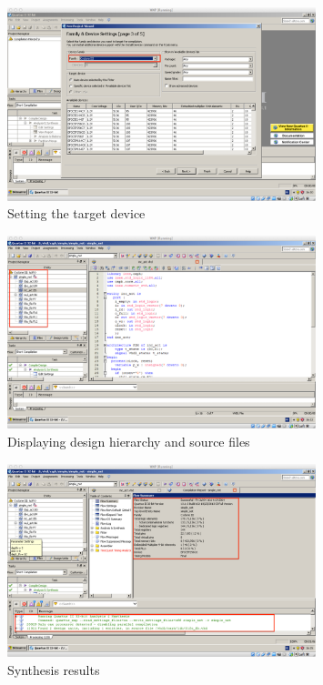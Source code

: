 \begin{figure}[htbp]
  \centering
 \includegraphics[angle=90,width=0.8\textwidth]{./figs/simple-quartus-4.pdf}
  \caption{Setting the target device}
  \label{fig:simple-quartus-4}
\end{figure}

\begin{figure}[htbp]
  \centering
 \includegraphics[angle=90,width=0.8\textwidth]{./figs/simple-quartus-5.pdf}
  \caption{Displaying design hierarchy and source files}
  \label{fig:simple-quartus-5}
\end{figure}

\begin{figure}[htbp]
  \centering
 \includegraphics[angle=90,width=0.8\textwidth]{./figs/simple-quartus-6.pdf}
  \caption{Synthesis results}
  \label{fig:simple-quartus-6}
\end{figure}


